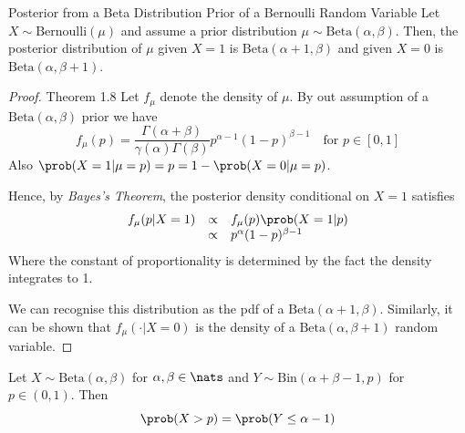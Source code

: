 \documentclass[11pt,a4paper]{article}
\begin{document}
  \begin{theorem}{Posterior from a Beta Distribution Prior of a Bernoulli Random Variable}
    Let $X\sim\text{Bernoulli}(\mu)$ and assume a prior distribution $\mu\sim\text{Beta}(\alpha,\beta)$. Then, the posterior distribution of $\mu$ given $X=1$ is $\text{Beta}(\alpha+1,\beta)$ and given $X=0$ is $\text{Beta}(\alpha,\beta+1)$.
  \end{theorem}

  \begin{proof}{Theorem 1.8}
    Let $f_\mu$ denote the density of $\mu$. By out assumption of a $\text{Beta}(\alpha,\beta)$ prior we have
    \[ f_\mu(p)=\frac{\Gamma(\alpha+\beta)}{\gamma(\alpha)\Gamma(\beta)}p^{\alpha-1}(1-p)^{\beta-1}\quad\text{for }p\in[0,1] \]
    Also $\prob(X=1|\mu=p)=p=1-\prob(X=0|\mu=p)$.
    \par Hence, by \textit{Bayes's Theorem}, the posterior density conditional on $X=1$ satisfies
    \[\begin{array}{rcl}
    f_\mu(p|X=1)&\propto&f_\mu(p)\prob(X=1|p)\\
    &\propto&p^\alpha(1-p)^{\beta-1}
    \end{array}\]
    Where the constant of proportionality is determined by the fact the density integrates to 1.
    \par We can recognise this distribution as the pdf of a $\text{Beta}(\alpha+1,\beta)$. Similarly, it can be shown that $f_\mu(\cdot|X=0)$ is the density of a $\text{Beta}(\alpha,\beta+1)$ random variable.
    \hfill\proved
  \end{proof}

  \begin{theorem}{}
    Let $X\sim\text{Beta}(\alpha,\beta)$ for $\alpha,\beta\in\nats$ and $Y\sim\text{Bin}(\alpha+\beta-1,p)$ for $p\in(0,1)$. Then
    \[ \prob(X>p)=\prob(Y\leq\alpha-1) \]
  \end{theorem}
\end{document}
